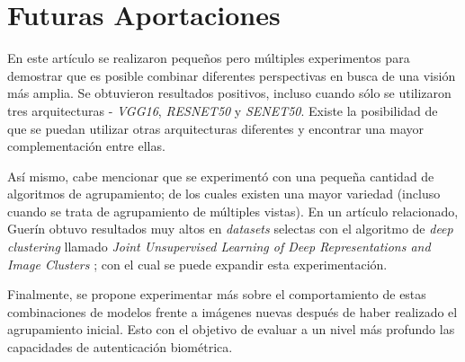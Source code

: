 \documentclass[letterpaper, 10 pt, conference]{ieeeconf}  %
\begin{document}
    \section{Futuras Aportaciones}
    En este artículo se realizaron pequeños pero múltiples experimentos para demostrar que es
    posible combinar diferentes perspectivas en busca de una visión más amplia. Se obtuvieron
    resultados positivos, incluso cuando sólo se utilizaron tres arquitecturas - \textit{VGG16},
    \textit{RESNET50} y \textit{SENET50}. Existe la posibilidad de que se puedan utilizar
    otras arquitecturas diferentes y encontrar una mayor complementación entre ellas.

    Así mismo, cabe mencionar que se experimentó con una pequeña cantidad de algoritmos de
    agrupamiento; de los cuales existen una mayor variedad (incluso cuando se trata de
    agrupamiento de múltiples vistas). En un artículo relacionado, Guerín obtuvo resultados
    muy altos en \textit{datasets} selectas con el algoritmo de \textit{deep clustering} llamado
    \textit{Joint Unsupervised Learning of Deep Representations and Image Clusters} \cite{JULE};
    con el cual se puede expandir esta experimentación.

    Finalmente, se propone experimentar más sobre el comportamiento de estas combinaciones de
    modelos frente a imágenes nuevas después de haber realizado el agrupamiento inicial. Esto
    con el objetivo de evaluar a un nivel más profundo las capacidades de autenticación biométrica.

\end{document}
